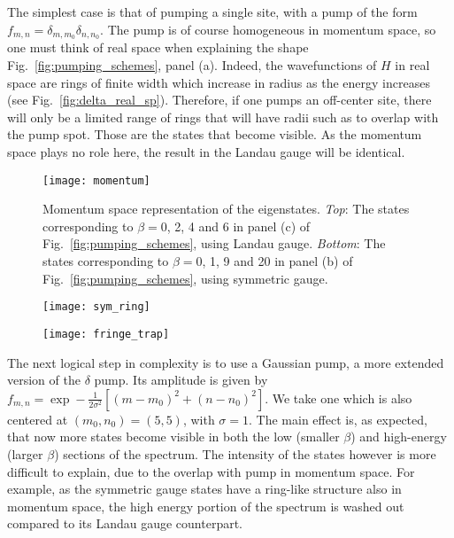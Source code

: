 \documentclass[twocolumn, 10pt, aps, superscriptaddress, floatfix, showpacs, pra, citeautoscript]{revtex4-1}
\newcommand{\co}[2]{#2}
\renewcommand{\paragraph}{\co}
\begin{document}
The simplest case is that of pumping a single site, with a pump of the
form $f_{m,n} = \delta_{m,m_0} \delta_{n,n_0}$. The pump is of course
homogeneous in momentum space, so one must think of real space when
explaining the shape Fig.~\ref{fig:pumping_schemes}, panel (a).
Indeed, the wavefunctions of $H$ in real space are rings of finite
width which increase in radius as the energy increases (see
Fig.~\ref{fig:delta_real_sp}). Therefore, if one pumps an off-center
site, there will only be a limited range of rings that will have radii
such as to overlap with the pump spot. Those are the states that
become visible. As the momentum space plays no role here, the result
in the Landau gauge will be identical.
%
\begin{figure}[htb]\centering
  \texttt{[image: momentum]} %
  \caption{Momentum space representation of the
    eigenstates. \emph{Top}: The states corresponding to $\beta=0$, 2,
    4 and 6 in panel (c) of Fig.~\ref{fig:pumping_schemes}, using
    Landau gauge.  \emph{Bottom}: The states corresponding to
    $\beta=0$, 1, 9 and 20 in panel (b) of
    Fig.~\ref{fig:pumping_schemes}, using symmetric gauge.}
  \label{fig:hom_mom_sp}
\end{figure}


\begin{figure}[htb]
  \centering
  \texttt{[image: sym\_ring]} %
  \caption{}
  \label{fig:torus_edge}
\end{figure}

\begin{figure}[htb]
  \centering
  \texttt{[image: fringe\_trap]} %
  \caption{}
  \label{fig:moving_trap}
\end{figure}

\paragraph{Gaussian pumping is now bound also in momentum space.}
The next logical step in complexity is to use a Gaussian pump, a more
extended version of the $\delta$ pump. Its amplitude is given by
$f_{m,n} = \exp- \frac{1}{2\sigma^2} \left[(m-m_0)^2 + (n-n_0)^2
\right]$.
We take one which is also centered at $(m_0,n_0) = (5,5)$, with
$\sigma =1$. The main effect is, as expected, that now more states
become visible in both the low (smaller $\beta$) and high-energy
(larger $\beta$) sections of the spectrum. The intensity of the states
however is more difficult to explain, due to the overlap with pump in
momentum space. For example, as the symmetric gauge states have a
ring-like structure also in momentum space, the high energy portion of
the spectrum is washed out compared to its Landau gauge counterpart.
\end{document}
